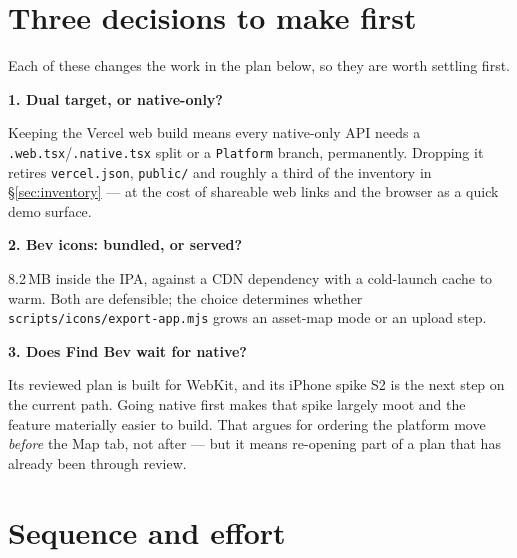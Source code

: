 \documentclass[11pt]{article}
\newcommand{\code}[1]{\texttt{\small #1}}
\begin{document}
\section{Three decisions to make first}

Each of these changes the work in the plan below, so they are worth settling first.

\begin{callout}
\textbf{\color{ink}1. Dual target, or native-only?}

Keeping the Vercel web build means every native-only API needs a \code{.web.tsx}/\code{.native.tsx}
split or a \code{Platform} branch, permanently. Dropping it retires \code{vercel.json},
\code{public/} and roughly a third of the inventory in \S\ref{sec:inventory} --- at the cost of shareable web links and
the browser as a quick demo surface.
\end{callout}

\begin{callout}
\textbf{\color{ink}2. Bev icons: bundled, or served?}

8.2\,MB inside the IPA, against a CDN dependency with a cold-launch cache to warm. Both are
defensible; the choice determines whether \code{scripts/icons/export-app.mjs} grows an asset-map mode
or an upload step.
\end{callout}

\begin{callout}
\textbf{\color{ink}3. Does Find Bev wait for native?}

Its reviewed plan is built for WebKit, and its iPhone spike S2 is the next step on the current path.
Going native first makes that spike largely moot and the feature materially easier to build. That
argues for ordering the platform move \emph{before} the Map tab, not after --- but it means
re-opening part of a plan that has already been through review.
\end{callout}

\section{Sequence and effort}
\end{document}
